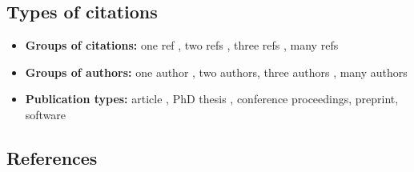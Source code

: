 \documentclass[a4paper]{article}
\begin{document}
\thispagestyle{empty}

\subsection{Types of citations}

\begin{itemize}
\item
	\textbf{Groups of citations:} one ref {\cite{karelPhD}}, two refs \cite{karelPhD,simplitigs},
  three refs \cite{karelPhD,gnt,simplitigs}, many refs
\item
  \textbf{Groups of authors:} one author \cite{karelPhD}, two authors, three
  authors \cite{simplitigs}, many authors \cite{gnt}
\item
  \textbf{Publication types:} article \cite{gnt}, PhD thesis \cite{karelPhD},
  conference proceedings, preprint, software
\end{itemize}


\subsection{References}

\printbibliography
\end{document}

